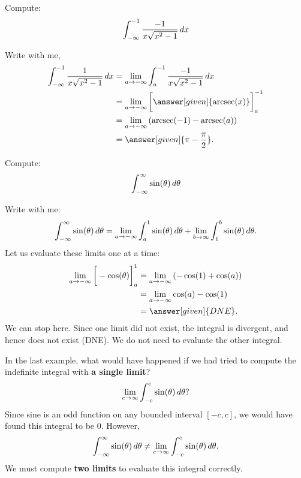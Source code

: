 \documentclass{ximera}
\begin{document}
\begin{example}	
  Compute:
  \[
  \int_{-\infty}^{-1}\frac{-1}{x\sqrt{x^2-1}} \mathop{}\!d x
  \]
  \begin{explanation}
    Write with me,
    \begin{align*}
      \int_{-\infty}^{-1} \frac{1}{x\sqrt{x^2-1}} \d x &= \lim_{a \to -\infty} \int_{a}^{-1} \frac{-1}{x\sqrt{x^2-1}}\d x\\
      &= \lim_{a \to -\infty} \eval{\answer[given]{\arcsec(x)}}_{a}^{-1} \\
      &= \lim_{a \to -\infty} \left(\arcsec(-1) - \arcsec(a)\right)\\
      &= \answer[given]{\pi - \frac{\pi}{2}}.
    \end{align*}
  \end{explanation}
  \end{example}

\begin{example}	
  Compute:
  \[
  \int_{-\infty}^\infty \sin(\theta) \mathop{}\!d \theta
  \]
  \begin{explanation}
    Write with me:
    \[
    \int_{-\infty}^\infty \sin(\theta) \mathop{}\!d \theta = \lim_{a\to -\infty} \int_a^1 \sin(\theta) \mathop{}\!d \theta + \lim_{b\to\infty}\int_1^b \sin(\theta) \mathop{}\!d \theta.
    \]
    Let us evaluate these limits one at a time:
    \begin{align*}  
      \lim_{a\to -\infty}\eval{-\cos(\theta)}_a^1 &= \lim_{a\to -\infty}\left(-\cos(1)+\cos(a)\right)\\
      &= \lim_{a\to -\infty} \cos(a) -\cos(1)\\
      &= \answer[given]{DNE}.
    \end{align*}
    We can stop here. Since one limit did not exist, the integral is
    divergent, and hence does not exist (DNE). We do not need to evaluate the other integral.
  \end{explanation}
\end{example}


\begin{warning}
In the last example, what would have happened if we had tried to
compute the indefinite integral with \textbf{a single limit}?
\[
\lim_{c\to \infty}\int_{-c}^c \sin(\theta)\mathop{}\!d \theta?
\]
Since sine is an odd function on any bounded interval $[-c,c]$, we
would have found this integral to be $0$. However,
\[
\int_{-\infty}^\infty \sin(\theta) \mathop{}\!d \theta \ne \lim_{c\to \infty}\int_{-c}^c \sin(\theta)\mathop{}\!d \theta.
\]
We must compute \textbf{two limits} to evaluate this
integral correctly.

\end{warning}
\end{document}
